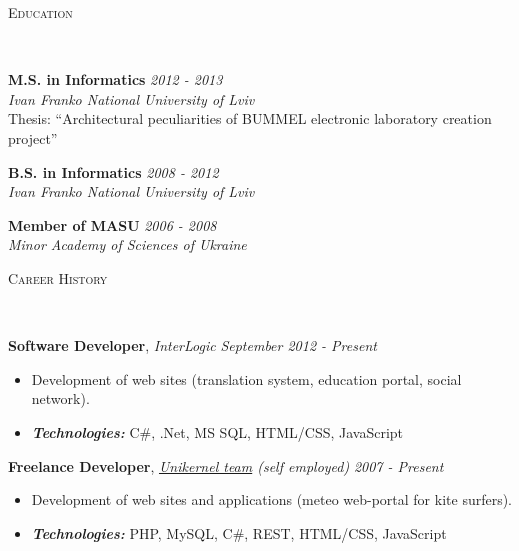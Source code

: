 \documentclass{article}
\newenvironment{changemargin}[2]{%
  \begin{list}{}{%
    \setlength{\topsep}{0pt}%
    \setlength{\leftmargin}{#1}%
    \setlength{\rightmargin}{#2}%
    \setlength{\listparindent}{\parindent}%
    \setlength{\itemindent}{\parindent}%
    \setlength{\parsep}{\parskip}%
  }%
  \item[]}{\end{list}
}
\newcommand{\lineover}{
  \begin{changemargin}{-1mm}{-1mm}
    \vspace*{-8pt}
    \hrulefill \\
    \vspace*{-2pt}
  \end{changemargin}
}
\newcommand{\header}[1]{
  \begin{changemargin}{-12mm}{-12mm}
    \scshape{#1}\\
    \lineover
  \end{changemargin}
}
\newenvironment{body}{
  \vspace*{-16pt}
  \begin{changemargin}{-6mm}{-12mm}
}{
  \end{changemargin}
}
\begin{document}



\header{Education}

\begin{body}
  \vspace{14pt}
  \textbf{M.S. in Informatics} \hfill \emph{2012 - 2013} \\
  \emph{Ivan Franko National University of Lviv} \\
  Thesis: ``Architectural peculiarities of BUMMEL electronic laboratory creation project''
  \medskip
  
  \textbf{B.S. in Informatics} \hfill \emph{2008 - 2012} \\
  \emph{Ivan Franko National University of Lviv}
  \medskip
  
  \textbf{Member of MASU} \hfill \emph{2006 - 2008} \\
  \emph{Minor Academy of Sciences of Ukraine}
  \medskip
\end{body}

\smallskip


\header{Career History}

\begin{body}
  \vspace{14pt}
  \textbf{Software Developer}, \emph{InterLogic} \hfill \emph{September 2012 - Present}\\
  \vspace*{-4pt}
  \begin{itemize} \itemsep -0pt
    \item Development of web sites (translation system, education portal, social network).
    \item \emph{\textbf{Technologies:}}{} C\#, .Net, MS SQL, HTML/CSS, JavaScript
  \end{itemize}
  \medskip

  \textbf {Freelance Developer}, \emph{\href{http://unikernel.net/}{Unikernel team} (self employed)} \hfill \emph{2007 - Present}\\
  \vspace*{-4pt}
  \begin{itemize} \itemsep -0pt
    \item Development of web sites and applications (meteo web-portal for kite surfers).
    \item \emph{\textbf{Technologies:}} PHP, MySQL, C\#, REST, HTML/CSS, JavaScript
  \end{itemize}

\end{body}
\end{document}
